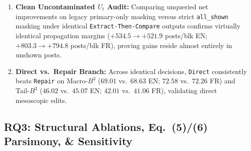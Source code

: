 \begin{enumerate}
    \item \textbf{Clean Uncontaminated $U_t$ Audit:} Comparing unqueried net improvements on legacy primary-only masking versus strict \texttt{all\_shown} masking under identical \texttt{Extract-Then-Compare} outputs confirms virtually identical propagation margins ($+534.5 \to +521.9$ posts/blk EN; $+803.3 \to +794.8$ posts/blk FR), proving gains reside almost entirely in unshown posts.
    \item \textbf{Direct vs.\ Repair Branch:} Across identical decisions, \texttt{Direct} consistently beats \texttt{Repair} on Macro-$B^3$ ($69.01$ vs.\ $68.63$ EN; $72.58$ vs.\ $72.26$ FR) and Tail-$B^3$ ($46.02$ vs.\ $45.07$ EN; $42.01$ vs.\ $41.06$ FR), validating direct mesoscopic edits.
\end{enumerate}

\subsection{RQ3: Structural Ablations, Eq.~(5)/(6) Parsimony, \& Sensitivity}
\label{sec:rq3}

